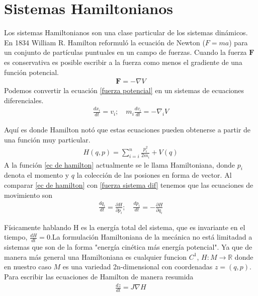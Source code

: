 \section{Sistemas Hamiltonianos}
Los sistemas Hamiltonianos son una clase particular de los sistemas dinámicos. En 1834 William R. Hamilton reformuló la ecuación de Newton ($F=ma$) para un conjunto de partículas puntuales en un campo de fuerzas. Cuando la fuerza $\mathbf{F}$ es conservativa es posible escribir a la fuerza como  menos el gradiente de una función potencial. 
\begin{eqnarray}
\mathbf{F}=-\nabla V \label{fuerza potencial}
\end{eqnarray}
Podemos convertir la ecuación \ref{fuerza potencial} en un sistemas de ecuaciones diferenciales.
\begin{eqnarray}
\frac{dx_{i}}{dt}=v_{i};   \quad m_{i}\frac{dv_{i}}{dt}=-\nabla_{i} V
\label{fuerza sistema dif}
\end{eqnarray}

Aquí es donde Hamilton notó que estas ecuaciones pueden obtenerse a partir de una función muy particular.
\begin{eqnarray}
H(q,p)=\sum_{i=i}^{n} \frac{p_{i}^{2}}{2m_{i}}+V(q) \label{ec de hamilton}
\end{eqnarray}
A la función \ref{ec de hamilton} actualmente se le llama Hamiltoniana, donde $p_{i}$ denota el momento y \textbf{$q$} la colección de las posiones en forma de vector. Al comparar \ref{ec de hamilton} con \ref{fuerza sistema dif} tenemos que las ecuaciones de movimiento son
\begin{eqnarray}
\frac{dq_{i}}{dt}=\frac{\partial H}{\partial p_{i}}; \quad
\frac{dp_{i}}{dt}=-\frac{\partial H}{\partial q_{i}}
\label{ec de mov hamilton}
\end{eqnarray}

Físicamente hablando H es la energía total del sistema, que es invariante en el tiempo, $\frac{dH}{dt}=0$.La formulación Hamiltoniana de la mecánica no está limitadad a sistemas que son de la forma "energía cinética más energía potencial". Ya que de manera más general una Hamiltoniana es cualquier funcion $C^{1}$, $H:M\rightarrow \mathbb{R}$ donde en nuestro caso $M$ es una variedad 2n-dimensional con coordenadas  $z=(q,p)$. Para escribir las ecuaciones de Hamilton de manera resumida
\begin{eqnarray}
\frac{dz}{dt}=J\nabla H \label{Hamilton-poisson}
\end{eqnarray}

